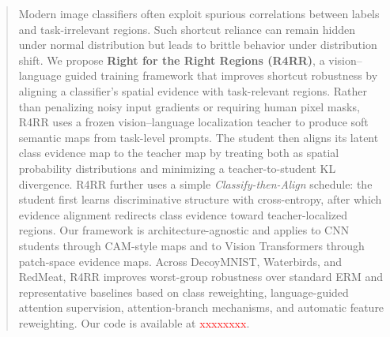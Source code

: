 \begin{abstract}
Modern image classifiers often exploit spurious correlations between labels and task-irrelevant regions. Such shortcut reliance can remain hidden under normal distribution but leads to brittle behavior under distribution shift. We propose \textbf{Right for the Right Regions (R4RR)}, a vision--language guided training framework that improves shortcut robustness by aligning a classifier's spatial evidence with task-relevant regions. Rather than penalizing noisy input gradients or requiring human pixel masks, R4RR uses a frozen vision--language localization teacher to produce soft semantic maps from task-level prompts. The student then aligns its latent class evidence map to the teacher map by treating both as spatial probability distributions and minimizing a teacher-to-student KL divergence. R4RR further uses a simple \emph{Classify-then-Align} schedule: the student first learns discriminative structure with cross-entropy, after which evidence alignment redirects class evidence toward teacher-localized regions. Our framework is architecture-agnostic and applies to CNN students through CAM-style maps and to Vision Transformers through patch-space evidence maps. Across DecoyMNIST, Waterbirds, and RedMeat, R4RR improves worst-group robustness over standard ERM and representative baselines based on class reweighting, language-guided attention supervision, attention-branch mechanisms, and automatic feature reweighting. Our code is available at \textcolor{red}{xxxxxxxx}.
\end{abstract}

